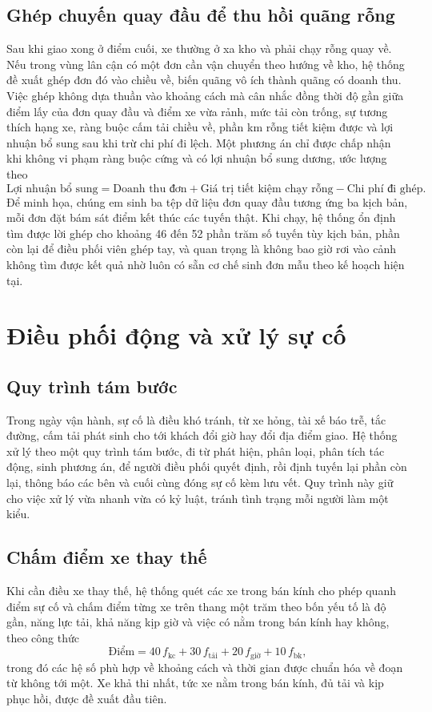 \documentclass[12pt,a4paper,oneside]{report}
\begin{document}
\section{Ghép chuyến quay đầu để thu hồi quãng rỗng}
Sau khi giao xong ở điểm cuối, xe thường ở xa kho và phải chạy rỗng quay về. Nếu trong vùng lân cận có một đơn cần vận chuyển theo hướng về kho, hệ thống đề xuất ghép đơn đó vào chiều về, biến quãng vô ích thành quãng có doanh thu. Việc ghép không dựa thuần vào khoảng cách mà cân nhắc đồng thời độ gần giữa điểm lấy của đơn quay đầu và điểm xe vừa rảnh, mức tải còn trống, sự tương thích hạng xe, ràng buộc cấm tải chiều về, phần km rỗng tiết kiệm được và lợi nhuận bổ sung sau khi trừ chi phí đi lệch. Một phương án chỉ được chấp nhận khi không vi phạm ràng buộc cứng và có lợi nhuận bổ sung dương, ước lượng theo
\begin{equation}
\text{Lợi nhuận bổ sung} = \text{Doanh thu đơn} + \text{Giá trị tiết kiệm chạy rỗng} - \text{Chi phí đi ghép}.
\end{equation}
Để minh họa, chúng em sinh ba tệp dữ liệu đơn quay đầu tương ứng ba kịch bản, mỗi đơn đặt bám sát điểm kết thúc các tuyến thật. Khi chạy, hệ thống ổn định tìm được lời ghép cho khoảng 46 đến 52 phần trăm số tuyến tùy kịch bản, phần còn lại để điều phối viên ghép tay, và quan trọng là không bao giờ rơi vào cảnh không tìm được kết quả nhờ luôn có sẵn cơ chế sinh đơn mẫu theo kế hoạch hiện tại.

\chapter{Điều phối động và xử lý sự cố}

\section{Quy trình tám bước}
Trong ngày vận hành, sự cố là điều khó tránh, từ xe hỏng, tài xế báo trễ, tắc đường, cấm tải phát sinh cho tới khách đổi giờ hay đổi địa điểm giao. Hệ thống xử lý theo một quy trình tám bước, đi từ phát hiện, phân loại, phân tích tác động, sinh phương án, để người điều phối quyết định, rồi định tuyến lại phần còn lại, thông báo các bên và cuối cùng đóng sự cố kèm lưu vết. Quy trình này giữ cho việc xử lý vừa nhanh vừa có kỷ luật, tránh tình trạng mỗi người làm một kiểu.

\section{Chấm điểm xe thay thế}
Khi cần điều xe thay thế, hệ thống quét các xe trong bán kính cho phép quanh điểm sự cố và chấm điểm từng xe trên thang một trăm theo bốn yếu tố là độ gần, năng lực tải, khả năng kịp giờ và việc có nằm trong bán kính hay không, theo công thức
\begin{equation}
\text{Điểm} = 40\,f_{\text{kc}} + 30\,f_{\text{tải}} + 20\,f_{\text{giờ}} + 10\,f_{\text{bk}},
\end{equation}
trong đó các hệ số phù hợp về khoảng cách và thời gian được chuẩn hóa về đoạn từ không tới một. Xe khả thi nhất, tức xe nằm trong bán kính, đủ tải và kịp phục hồi, được đề xuất đầu tiên.
\end{document}
